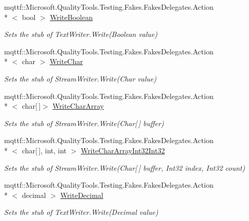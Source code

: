 \begin{DoxyCompactItemize}
mqttf\-::\-Microsoft.\-Quality\-Tools.\-Testing.\-Fakes.\-Fakes\-Delegates.\-Action\\*
$<$ bool $>$ \hyperlink{class_system_1_1_i_o_1_1_fakes_1_1_stub_stream_writer_aa0070db5967bf26b24edc6c308f65557}{Write\-Boolean}
\begin{DoxyCompactList}\small\item\em Sets the stub of Text\-Writer.\-Write(\-Boolean value)\end{DoxyCompactList}\item 
mqttf\-::\-Microsoft.\-Quality\-Tools.\-Testing.\-Fakes.\-Fakes\-Delegates.\-Action\\*
$<$ char $>$ \hyperlink{class_system_1_1_i_o_1_1_fakes_1_1_stub_stream_writer_a151471bb62da95f2fb6e15db5a4c8ae4}{Write\-Char}
\begin{DoxyCompactList}\small\item\em Sets the stub of Stream\-Writer.\-Write(\-Char value)\end{DoxyCompactList}\item 
mqttf\-::\-Microsoft.\-Quality\-Tools.\-Testing.\-Fakes.\-Fakes\-Delegates.\-Action\\*
$<$ char\mbox{[}$\,$\mbox{]}$>$ \hyperlink{class_system_1_1_i_o_1_1_fakes_1_1_stub_stream_writer_a61fef34aca3bbfe74ee8ad3b8e637900}{Write\-Char\-Array}
\begin{DoxyCompactList}\small\item\em Sets the stub of Stream\-Writer.\-Write(\-Char\mbox{[}$\,$\mbox{]} buffer)\end{DoxyCompactList}\item 
mqttf\-::\-Microsoft.\-Quality\-Tools.\-Testing.\-Fakes.\-Fakes\-Delegates.\-Action\\*
$<$ char\mbox{[}$\,$\mbox{]}, int, int $>$ \hyperlink{class_system_1_1_i_o_1_1_fakes_1_1_stub_stream_writer_a0775227ed19e5c73f3ef0a4b78235a6b}{Write\-Char\-Array\-Int32\-Int32}
\begin{DoxyCompactList}\small\item\em Sets the stub of Stream\-Writer.\-Write(\-Char\mbox{[}$\,$\mbox{]} buffer, Int32 index, Int32 count)\end{DoxyCompactList}\item 
mqttf\-::\-Microsoft.\-Quality\-Tools.\-Testing.\-Fakes.\-Fakes\-Delegates.\-Action\\*
$<$ decimal $>$ \hyperlink{class_system_1_1_i_o_1_1_fakes_1_1_stub_stream_writer_a0e0490e1d9510bcced1d0a8496968b28}{Write\-Decimal}
\begin{DoxyCompactList}\small\item\em Sets the stub of Text\-Writer.\-Write(\-Decimal value)\end{DoxyCompactList}\item 

\end{DoxyCompactItemize}
